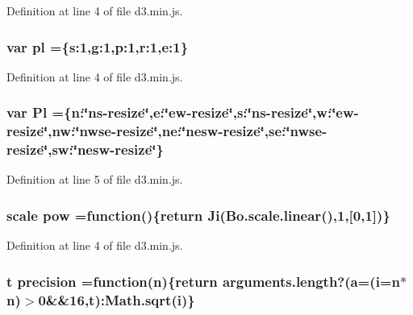 Definition at line 4 of file d3.\+min.\+js.

\subsubsection[{pl}]{\setlength{\rightskip}{0pt plus 5cm}var pl =\{s\+:1,g\+:1,p\+:1,r\+:1,e\+:1\}}\label{d3_8min_8js_aa9d7331c8877879e4f00cd1593e2bc07}


Definition at line 4 of file d3.\+min.\+js.

\subsubsection[{Pl}]{\setlength{\rightskip}{0pt plus 5cm}var Pl =\{n\+:\char`\"{}ns-\/resize\char`\"{},e\+:\char`\"{}ew-\/resize\char`\"{},s\+:\char`\"{}ns-\/resize\char`\"{},w\+:\char`\"{}ew-\/resize\char`\"{},nw\+:\char`\"{}nwse-\/resize\char`\"{},ne\+:\char`\"{}nesw-\/resize\char`\"{},se\+:\char`\"{}nwse-\/resize\char`\"{},sw\+:\char`\"{}nesw-\/resize\char`\"{}\}}\label{d3_8min_8js_ac0b4052f5093945be195262933b5d279}


Definition at line 5 of file d3.\+min.\+js.

\subsubsection[{pow}]{ {\bf scale} pow =function()\{{\bf return} {\bf Ji}({\bf Bo.\+scale.\+linear}(),1,[0,1])\}}\label{d3_8min_8js_a8b3ea3feaa541d12b44e5bb7ed3ddad5}


Definition at line 4 of file d3.\+min.\+js.

\subsubsection[{precision}]{ t precision =function({\bf n})\{{\bf return} arguments.\+length?({\bf a}=({\bf i}={\bf n}$\ast${\bf n})$>$0\&\&16,t)\+:{\bf Math.\+sqrt}({\bf i})\}}\label{d3_8min_8js_a5e69884df2bd132acdf36fdfee035812}


